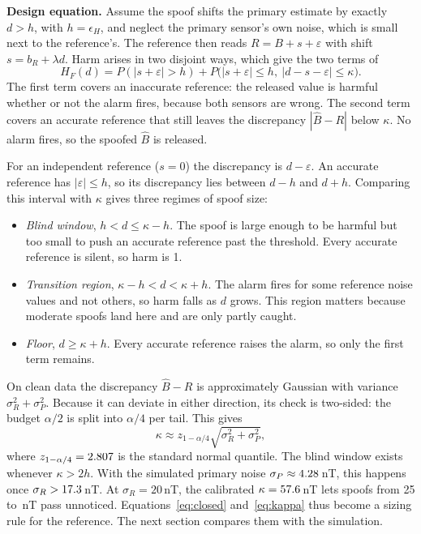 \documentclass[conference,9pt]{IEEEtran}
\newcommand{\Bhat}{\widehat{B}}
\begin{document}
\textbf{Design equation.} Assume the spoof shifts the primary estimate by exactly $d>h$, with
$h=\epsilon_H$, and neglect the primary sensor's own noise, which is small next to the reference's.
The reference then reads $R=B+s+\varepsilon$ with shift $s=b_R+\lambda d$. Harm arises in two
disjoint ways, which give the two terms of
\begin{equation}
 H_F(d)=P(|s+\varepsilon|>h)+P\bigl(|s+\varepsilon|\le h,\ |d-s-\varepsilon|\le\kappa\bigr).
 \label{eq:closed}
\end{equation}
The first term covers an inaccurate reference: the released value is harmful whether or not the
alarm fires, because both sensors are wrong. The second term covers an accurate reference that
still leaves the discrepancy $|\Bhat-R|$ below $\kappa$. No alarm fires, so the spoofed $\Bhat$ is
released.

For an independent reference ($s=0$) the discrepancy is $d-\varepsilon$. An accurate reference has
$|\varepsilon|\le h$, so its discrepancy lies between $d-h$ and $d+h$. Comparing this interval with
$\kappa$ gives three regimes of spoof size:
\begin{itemize}
\item \emph{Blind window}, $h<d\le\kappa-h$. The spoof is large enough to be harmful but too small
to push an accurate reference past the threshold. Every accurate reference is silent, so harm
is 1.
\item \emph{Transition region}, $\kappa-h<d<\kappa+h$. The alarm fires for some reference noise
values and not others, so harm falls as $d$ grows. This region matters because moderate spoofs
land here and are only partly caught.
\item \emph{Floor}, $d\ge\kappa+h$. Every accurate reference raises the alarm, so only the first
term remains.
\end{itemize}
On clean data the discrepancy $\Bhat-R$ is approximately Gaussian with variance
$\sigma_R^2+\sigma_P^2$. Because it can deviate in either direction, its check is two-sided: the
budget $\alpha/2$ is split into $\alpha/4$ per tail. This gives
\begin{equation}
 \kappa\approx z_{1-\alpha/4}\sqrt{\sigma_R^2+\sigma_P^2},
 \label{eq:kappa}
\end{equation}
where $z_{1-\alpha/4}=2.807$ is the standard normal quantile. The blind window exists whenever
$\kappa>2h$. With the simulated primary noise $\sigma_P\approx4.28$\,nT, this happens
once $\sigma_R>17.3$\,nT. At $\sigma_R=20$\,nT, the calibrated $\kappa=57.6$\,nT lets spoofs from 25 to
\TheoryBlindUpper\,nT pass unnoticed. Equations~\eqref{eq:closed} and~\eqref{eq:kappa} thus become a
sizing rule for the reference. The next section compares them with the simulation.
\end{document}
